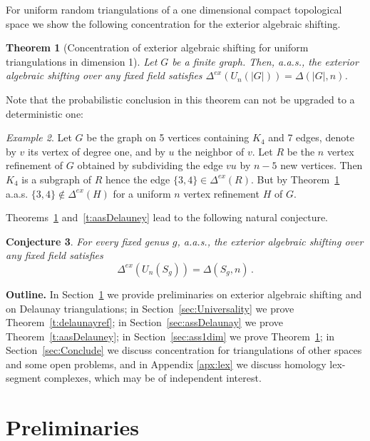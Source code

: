 \documentclass[11pt]{article}
\newtheorem{theorem}{Theorem}
\newtheorem{conjecture}[theorem]{Conjecture}
\numberwithin{claimcounter}{theorem}
\theoremstyle{remark}
\newtheorem{example}[theorem]{Example}
\theoremstyle{definition}
\numberwithin{theorem}{section}
\newcommand{\exshift}[1]{\Delta^{ex}(#1)}
\begin{document}
For uniform random triangulations of a one dimensional compact topological space we show the following concentration for the exterior algebraic shifting.
\begin{theorem}[Concentration of exterior algebraic shifting for uniform triangulations in dimension 1]\label{t:aasUniform1-dim}
   Let $G$ be a finite graph. Then, a.a.s., the exterior algebraic shifting over any fixed field satisfies $\exshift {U_n(|G|)}
   = \Delta(|G|,n)$.
\end{theorem}
Note that the probabilistic conclusion in this theorem can not be upgraded to a deterministic one:
\begin{example}\label{ex:graph}
Let $G$ be the graph on 5 vertices containing $K_4$ and 7 edges, denote by $v$ its vertex of degree one, and by $u$ the neighbor of $v$. Let $R$ be the $n$ vertex refinement of $G$ obtained by subdividing the edge $vu$ by $n-5$ new vertices. Then $K_4$ is a subgraph of $R$ hence the edge $\{3,4\}\in \exshift R$. But by Theorem~\ref{t:aasUniform1-dim}  a.a.s. $\{3,4\}\notin \exshift H$ for a uniform $n$ vertex refinement $H$ of $G$.
\end{example}
%
%
Theorems~\ref{t:aasUniform1-dim} and~\ref{t:aasDelauney} lead to the following natural conjecture.
\begin{conjecture}\label{conj:uniform_surface}
For every fixed genus $g$, a.a.s., the exterior algebraic shifting over any fixed field satisfies
     $$\exshift {U_n(S_g)}
     =\Delta(S_g,n)\,.$$
\end{conjecture}
%
%
%
{\bf Outline.} 
In Section~\ref{sec:Prelim} we provide preliminaries on exterior algebraic shifting and on Delaunay triangulations; 
in Section~\ref{sec:Universality} we prove Theorem~\ref{t:delaunayref};  in Section~\ref{sec:assDelaunay} we prove Theorem~\ref{t:aasDelauney}; in Section~\ref{sec:ass1dim} we prove Theorem~\ref{t:aasUniform1-dim}; in Section~\ref{sec:Conclude} we discuss concentration for triangulations of other spaces and some open problems, and in Appendix \ref{apx:lex} we discuss homology lex-segment complexes, which may be of independent interest.
%
\section{Preliminaries}\label{sec:Prelim} 
%
\end{document}
